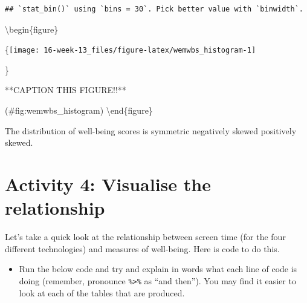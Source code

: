 \documentclass[]{book}
\providecommand{\tightlist}{%
  \setlength{\itemsep}{0pt}\setlength{\parskip}{0pt}}
\begin{document}
\begin{verbatim}
## `stat_bin()` using `bins = 30`. Pick better value with `binwidth`.
\end{verbatim}

\textbackslash{}begin\{figure\}

\{\centering \texttt{[image: 16-week-13\_files/figure-latex/wemwbs\_histogram-1]}

\}

\caption{**CAPTION THIS FIGURE!!**}

(\#fig:wemwbs\_histogram)
\textbackslash{}end\{figure\}

The distribution of well-being scores is symmetric negatively skewed positively skewed.

\hypertarget{activity-4-visualise-the-relationship}{%
\section{Activity 4: Visualise the relationship}\label{activity-4-visualise-the-relationship}}

Let's take a quick look at the relationship between screen time (for the four different technologies) and measures of well-being. Here is code to do this.

\begin{itemize}
\tightlist
\item
  Run the below code and try and explain in words what each line of code is doing (remember, pronounce \texttt{\%\textgreater{}\%} as ``and then''). You may find it easier to look at each of the tables that are produced.
\end{itemize}
\end{document}
